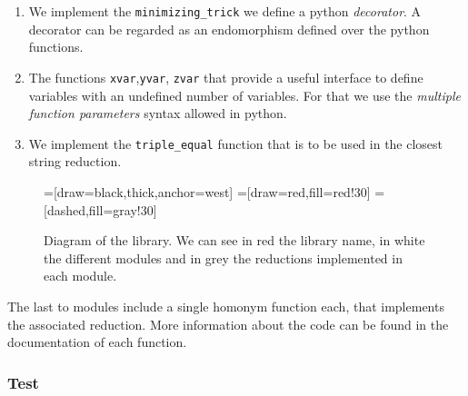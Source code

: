   \begin{enumerate}

  \item We implement the \texttt{minimizing\_trick} we define a python \emph{decorator}. A decorator can be regarded as an endomorphism defined over the python functions.
  \item The functions \texttt{xvar},\texttt{yvar}, \texttt{zvar} that provide a useful interface to define variables with an undefined number of variables. For that we use the \emph{multiple function parameters} syntax allowed in python.
    
  \item We implement the \texttt{triple\_equal} function that is to be used in the closest string reduction.
  \end{enumerate}  
\begin{figure}[h]
\begin{center}
=[draw=black,thick,anchor=west]
=[draw=red,fill=red!30]
=[dashed,fill=gray!30]
  \caption{Diagram of the library. We can see in red the library name, in white the different modules and in grey the reductions implemented in each module. }
\label{fig:org}
\end{center}
\end{figure}


The last to modules include a single homonym function each, that implements the associated reduction. More information about the code can be found in the documentation of each function. 

\newpage
\subsubsection{Test}

